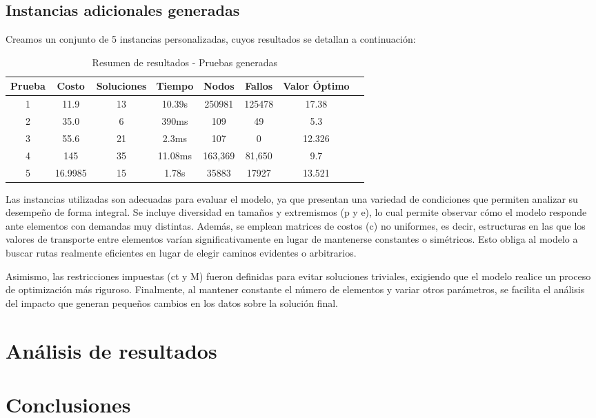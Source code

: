 \subsection{Instancias adicionales generadas}

Creamos un conjunto de 5 instancias personalizadas, cuyos resultados se detallan a continuación:


\begin{table}[H]
\centering
\caption{Resumen de resultados - Pruebas generadas}
\begin{tabular}{|c|c|c|c|c|c|c|c|}
\hline
\rowcolor{gray!30}
\textbf{Prueba} & \textbf{Costo} & \textbf{Soluciones} & \textbf{Tiempo} & \textbf{Nodos} & \textbf{Fallos} & \textbf{Valor Óptimo} \\
\hline
1   &  11.9 & 13   & 10.39s  & 250981   & 125478   & 17.38 \\
2     & 35.0  &  6 & 390ms  &  109 & 49  & 5.3 \\
3   &  55.6 &  21  & 2.3ms &  107  & 0 & 12.326 \\
4   & 145 & 35  & 11.08ms  & 163,369 & 81,650  & 9.7 \\
5  & 16.9985 & 15 & 1.78s  & 35883 &  17927  & 13.521 \\
\hline
\end{tabular}
\end{table}

Las instancias utilizadas son adecuadas para evaluar el modelo, ya que presentan una variedad de condiciones que permiten analizar su desempeño de forma integral. Se incluye diversidad en tamaños y extremismos (p y e), lo cual permite observar cómo el modelo responde ante elementos con demandas muy distintas. Además, se emplean matrices de costos (c) no uniformes, es decir, estructuras en las que los valores de transporte entre elementos varían significativamente en lugar de mantenerse constantes o simétricos. Esto obliga al modelo a buscar rutas realmente eficientes en lugar de elegir caminos evidentes o arbitrarios.

Asimismo, las restricciones impuestas (ct y M) fueron definidas para evitar soluciones triviales, exigiendo que el modelo realice un proceso de optimización más riguroso. Finalmente, al mantener constante el número de elementos y variar otros parámetros, se facilita el análisis del impacto que generan pequeños cambios en los datos sobre la solución final.

\section{Análisis de resultados}

\section{Conclusiones}


